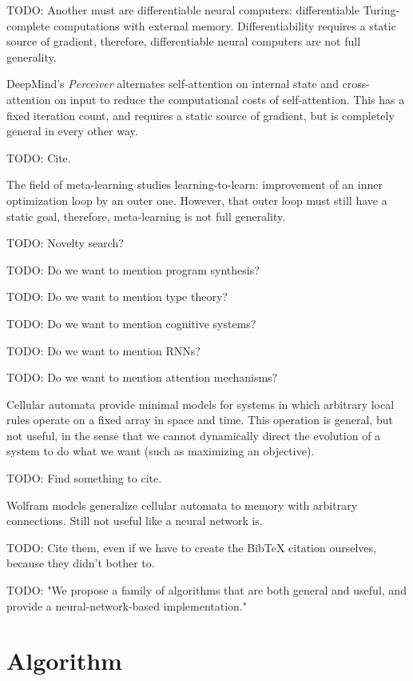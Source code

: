 \documentclass{article}
\begin{document}
    TODO: Another must are differentiable neural computers: differentiable Turing-complete computations with external memory. Differentiability requires a static source of gradient, therefore, differentiable neural computers are not full generality.

DeepMind's \textit{Perceiver} \cite{DBLP:journals/corr/abs-2103-03206} alternates self-attention on internal state and cross-attention on input to reduce the computational costs of self-attention. This has a fixed iteration count, and requires a static source of gradient, but is completely general in every other way.

    TODO: Cite.

The field of meta-learning studies learning-to-learn: improvement of an inner optimization loop by an outer one. However, that outer loop must still have a static goal, therefore, meta-learning is not full generality.

    TODO: Novelty search?

    TODO: Do we want to mention program synthesis?

    TODO: Do we want to mention type theory?

    TODO: Do we want to mention cognitive systems?

    TODO: Do we want to mention RNNs?

    TODO: Do we want to mention attention mechanisms?

Cellular automata provide minimal models for systems in which arbitrary local rules operate on a fixed array in space and time. This operation is general, but not useful, in the sense that we cannot dynamically direct the evolution of a system to do what we want (such as maximizing an objective).

    TODO: Find something to cite.

Wolfram models generalize cellular automata to memory with arbitrary connections. Still not useful like a neural network is.

    TODO: Cite them, even if we have to create the BibTeX citation ourselves, because they didn't bother to.

    TODO: "We propose a family of algorithms that are both general and useful, and provide a neural-network-based implementation."

\section{Algorithm}
\end{document}
